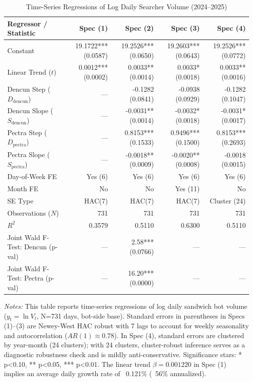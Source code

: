 \begin{table}[htbp]
\centering
\caption{Time-Series Regressions of Log Daily Searcher Volume (2024--2025)}
\label{tab:timeseries_regressions}
\begin{tabular}{lrrrr}
\toprule
Regressor / Statistic & Spec (1) & Spec (2) & Spec (3) & Spec (4) \\
\midrule
Constant & 19.1722*** (0.0587) & 19.2526*** (0.0650) & 19.2603*** (0.0643) & 19.2526*** (0.0772) \\
Linear Trend ($t$) & 0.0012*** (0.0002) & 0.0033** (0.0014) & 0.0033* (0.0018) & 0.0033** (0.0016) \\
Dencun Step ($D_{\text{dencun}}$) & --- & -0.1282 (0.0841) & -0.0938 (0.0929) & -0.1282 (0.1047) \\
Dencun Slope ($S_{\text{dencun}}$) & --- & -0.0031** (0.0014) & -0.0032* (0.0018) & -0.0031* (0.0017) \\
Pectra Step ($D_{\text{pectra}}$) & --- & 0.8153*** (0.1533) & 0.9496*** (0.1500) & 0.8153*** (0.2693) \\
Pectra Slope ($S_{\text{pectra}}$) & --- & -0.0018** (0.0009) & -0.0020** (0.0008) & -0.0018 (0.0015) \\
Day-of-Week FE & Yes (6) & Yes (6) & Yes (6) & Yes (6) \\
Month FE & No & No & Yes (11) & No \\
SE Type & HAC(7) & HAC(7) & HAC(7) & Cluster (24) \\
Observations ($N$) & 731 & 731 & 731 & 731 \\
$R^2$ & 0.3579 & 0.5110 & 0.6300 & 0.5110 \\
Joint Wald F-Test: Dencun (p-val) & --- & 2.58*** (0.0766) & --- & --- \\
Joint Wald F-Test: Pectra (p-val) & --- & 16.20*** (0.0000) & --- & --- \\
\bottomrule
\end{tabular}
\vspace{0.2cm}
\begin{minipage}{\linewidth}
\small
\textit{Notes:} This table reports time-series regressions of log daily sandwich bot volume ($y_t = \ln V_t$, N=731 days, bot-side base). Standard errors in parentheses in Specs (1)--(3) are Newey-West HAC robust with 7 lags to account for weekly seasonality and autocorrelation ($AR(1) \approx 0.78$). In Spec (4), standard errors are clustered by year-month (24 clusters); with 24 clusters, cluster-robust inference serves as a diagnostic robustness check and is mildly anti-conservative. Significance stars: * p<0.10, ** p<0.05, *** p<0.01. The linear trend $\beta = 0.001220$ in Spec (1) implies an average daily growth rate of ~0.121\% (~56\% annualized).
\end{minipage}
\end{table}
